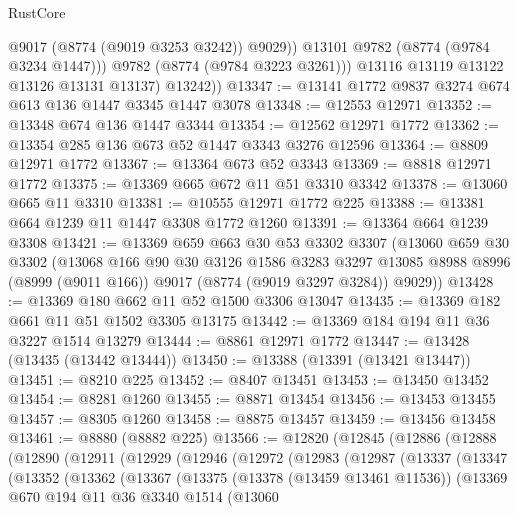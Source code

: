 \begin{lexlean}{RustCore}
\begin{coremodule}
                  @9017
                  (@8774 (@9019 @3253 @3242))
                  @9029))
              @13101
              @9782
              (@8774 (@9784 @3234 @1447)))
            @9782
            (@8774 (@9784 @3223 @3261)))
          @13116
          @13119
          @13122
          @13126
          @13131
          @13137)
        @13242))
@13347 := @13141 @1772 @9837 @3274 @674 @613 @136 @1447 @3345 @1447 @3078
@13348 := @12553 @12971
@13352 := @13348 @674 @136 @1447 @3344
@13354 := @12562 @12971 @1772
@13362 := @13354 @285 @136 @673 @52 @1447 @3343 @3276 @12596
@13364 := @8809 @12971 @1772
@13367 := @13364 @673 @52 @3343
@13369 := @8818 @12971 @1772
@13375 := @13369 @665 @672 @11 @51 @3310 @3342
@13378 := @13060 @665 @11 @3310
@13381 := @10555 @12971 @1772 @225
@13388 := @13381 @664 @1239 @11 @1447 @3308 @1772 @1260
@13391 := @13364 @664 @1239 @3308
@13421 := @13369
    @659
    @663
    @30
    @53
    @3302
    @3307
    (@13060
      @659
      @30
      @3302
      (@13068
        @166
        @90
        @30
        @3126
        @1586
        @3283
        @3297
        @13085
        @8988
        @8996
        (@8999 (@9011 @166))
        @9017
        (@8774 (@9019 @3297 @3284))
        @9029))
@13428 := @13369 @180 @662 @11 @52 @1500 @3306 @13047
@13435 := @13369 @182 @661 @11 @51 @1502 @3305 @13175
@13442 := @13369 @184 @194 @11 @36 @3227 @1514 @13279
@13444 := @8861 @12971 @1772
@13447 := @13428 (@13435 (@13442 @13444))
@13450 := @13388 (@13391 (@13421 @13447))
@13451 := @8210 @225
@13452 := @8407 @13451
@13453 := @13450 @13452
@13454 := @8281 @1260
@13455 := @8871 @13454
@13456 := @13453 @13455
@13457 := @8305 @1260
@13458 := @8875 @13457
@13459 := @13456 @13458
@13461 := @8880 (@8882 @225)
@13566 := @12820
    (@12845
      (@12886
        (@12888
          (@12890
            (@12911
              (@12929
                (@12946
                  (@12972
                    (@12983
                      (@12987
                        (@13337
                          (@13347
                            (@13352
                              (@13362
                                (@13367
                                  (@13375
                                    (@13378 (@13459 @13461 @11536))
                                    (@13369
                                      @670
                                      @194
                                      @11
                                      @36
                                      @3340
                                      @1514
                                      (@13060

\end{coremodule}
\end{lexlean}
